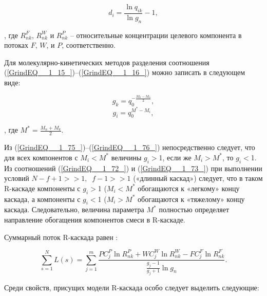 \begin{equation} \label{GrindEQ__1_74_} 
  d_{i} =\frac{\ln q_{ik} }{\ln g_{n} } -1,              
\end{equation}

, где $R_{n k}^{F}$, $R_{n k}^{W}$ и $R_{n k}^{P}$ -- относительные концентрации целевого компонента в потоках $F$, $W$, и $P$, соответственно.

Для молекулярно-кинетических методов разделения соотношения (\ref{GrindEQ__1_15_})--(\ref{GrindEQ__1_16_}) можно записать в следующем виде:

\begin{equation} \label{GrindEQ__1_75_} 
  g_{k} =q_{0}^{-\frac{M_{k} -M_{n} }{2} } ,        
  \end{equation} 
  \begin{equation} \label{GrindEQ__1_76_} 
  g_{i} =q_{0}^{M^{*} -M_{i} } ,        
\end{equation} 

, где $M^{*} =\frac{M_{n} +M_{k} }{2} $.

Из (\ref{GrindEQ__1_75_})--(\ref{GrindEQ__1_76_}) непосредственно следует, что для всех компонентов с $M_{i} $$\mathrm{<}$$M^{*} $ величины $g_{i} $$\mathrm{>}$1, если же $M_{i} $$\mathrm{>}$$M^{*} $, то $g_{i} $$\mathrm{<}$1. Из соотношений (\ref{GrindEQ__1_72_}) и (\ref{GrindEQ__1_73_}) при выполнении условий $N-f+1>>1,\; \; f-1>>1$ («длинный каскад») следует, что в таком R-каскаде компоненты с $g_{i} $$\mathrm{>}$1 ($M_{i} $$\mathrm{<}$$M^{*} $ обогащаются к «легкому» концу каскада, а компоненты с $g_{i} $$\mathrm{<}$1 ($M_{i} $$\mathrm{>}$$M^{*}$ обогащаются к «тяжелому» концу каскада. Следовательно, величина параметра $M^{*}$ полностью определяет направление обогащения компонентов смеси в R-каскаде. 

Суммарный поток R-каскада равен \cite{sulaberidzeTeoriyaKaskadovDlya2011}:

\begin{equation} \label{GrindEQ__1_77_} 
  \sum _{s=1}^{N}L(s) =\sum _{j=1}^{m}\frac{PC_{j}^{P} \ln R_{nk}^{P} +WC_{j}^{W} \ln R_{nk}^{W} -FC_{j}^{F} \ln R_{nk}^{F} }{\frac{g_{j} -1}{g_{j} +1} \ln g_{n} }  .               
\end{equation} 

Среди свойств, присущих модели R-каскада особо следует выделить следующие:

